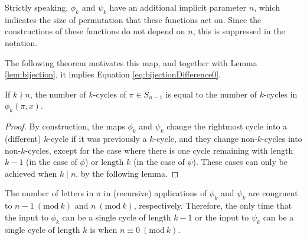 \begin{note}
  Strictly speaking, $\phi_k$ and $\psi_k$ have an additional implicit
  parameter $n$, which indicates the size of permutation that these functions
  act on. Since the constructions of these functions do not depend on $n$, this
  is suppressed in the notation.
\end{note}
The following theorem motivates this map,
and together with Lemma \ref{lem:bijection}, it implies Equation \eqref{eq:bijectionDifference0}.
\begin{theorem}
  If $k \nmid n$, the number of $k$-cycles of $\pi \in S_{n-1}$ is equal to the number of $k$-cycles in
  $\phi_k(\pi,x)$.
\end{theorem}
\begin{proof}
  By construction, the maps $\phi_k$ and $\psi_k$ change the rightmost cycle
  into a (different) $k$-cycle if it was previously a $k$-cycle, and they
  change non-$k$-cycles into non-$k$-cycles, except for the case where there is
  one cycle remaining with length $k-1$ (in the case of $\phi$) or length $k$
  (in the case of $\psi$). These cases can only be achieved when $k \mid n$, by
  the following lemma.
\end{proof}
\begin{lemma}
  The number of letters in $\pi$ in (recursive) applications of $\phi_k$ and
  $\psi_k$ are congruent to $n - 1\ (\mathrm{mod}\ k)$ and $n\ (\mathrm{mod}\ k)$,
  respectively.
  Therefore, the only time that the input to $\phi_k$ can be a single cycle of
  length $k-1$ or the input to $\psi_k$ can be a single cycle of length $k$ is
  when ${n \equiv 0\ (\mathrm{mod}\ k)}$.
\end{lemma}
